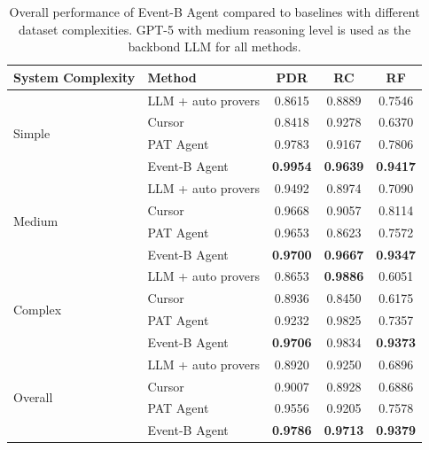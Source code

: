\begin{table}[h!]
\footnotesize
\centering
\begin{tabular}{llccc}

\toprule
System Complexity & Method & PDR & RC & RF \\
\midrule
\multirow{4}{*}{Simple}
 & LLM + auto provers & 0.8615 & 0.8889 & 0.7546 \\
 & Cursor & 0.8418 & 0.9278 & 0.6370 \\
 & PAT Agent & 0.9783 & 0.9167 & 0.7806 \\
 & Event-B Agent & \textbf{0.9954} & \textbf{0.9639} & \textbf{0.9417} \\


\midrule
\multirow{4}{*}{Medium}
 & LLM + auto provers & 0.9492 & 0.8974 & 0.7090 \\
 & Cursor & 0.9668 & 0.9057 & 0.8114 \\
 & PAT Agent & 0.9653 & 0.8623 & 0.7572 \\
 & Event-B Agent & \textbf{0.9700} & \textbf{0.9667} & \textbf{0.9347} \\


\midrule
\multirow{4}{*}{Complex}
 & LLM + auto provers & 0.8653 & \textbf{0.9886} & 0.6051 \\
 & Cursor & 0.8936 & 0.8450 & 0.6175 \\
 & PAT Agent & 0.9232 & 0.9825 & 0.7357 \\
 & Event-B Agent & \textbf{0.9706} & 0.9834 & \textbf{0.9373} \\


\midrule
\multirow{4}{*}{Overall}
 & LLM + auto provers & 0.8920 & 0.9250 & 0.6896 \\
 & Cursor & 0.9007 & 0.8928 & 0.6886 \\
 & PAT Agent & 0.9556 & 0.9205 & 0.7578 \\
 & Event-B Agent & \textbf{0.9786} & \textbf{0.9713} & \textbf{0.9379} \\
\bottomrule

\end{tabular}
\caption{Overall performance of Event-B Agent compared to baselines with different dataset complexities.
GPT-5 with medium reasoning level is used as the backbond LLM for all methods.}
\label{tab:RQ1}
\end{table}
